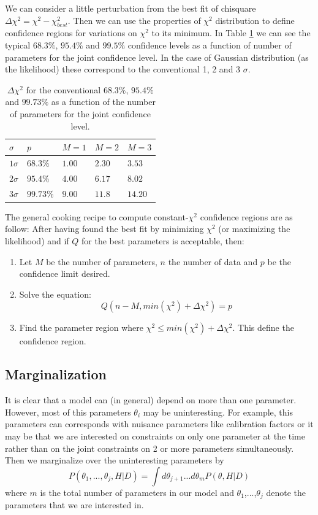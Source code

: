 \documentclass[onecolumn,           %
               showpacs,            %
               preprintnumbers,     %
               aps,                 %
               prl,          	    %
               letterpaper,             %
               superscriptaddress,      %
               nofootinbib,         %
               tightenlines,        %
               floats,floatfix      %
               ,usenatbib,
               ]{revtex4-1}
\begin{document}
We can consider a little perturbation from the best fit of chisquare $\Delta\chi^2=\chi^2-\chi^2_{best}$. Then we can use the properties of $\chi^2$ distribution to define confidence regions for variations on $\chi^2$ to its minimum. In Table \ref{tableerrors} we can see the typical $68.3 \%$, $95.4\%$ and $99.5\%$ confidence levels as a function of number of parameters for the joint confidence level. In the case of Gaussian distribution (as the likelihood) these correspond to the conventional 1, 2 and 3 $\sigma$.
\begin{table}[h!]
\centering
\begin{tabular}{||l|l|l|l|l||} 
 \hline
$\sigma$ & $p$ & $M=1$ & $M=2$ & $M=3$\\
\hline
$1\sigma$ & $68.3 \%$ & $1.00$ & $2.30$ & $3.53$\\
$2\sigma$ & $95.4 \%$ & $4.00$ & $6.17$ & $8.02$\\
$3\sigma$ & $99.73\%$ & $9.00$ & $11.8$ & $14.20$\\
\hline
\end{tabular}
\caption{\footnotesize{$\Delta \chi^2$ for the conventional $68.3\%$, $95.4\%$ and $99.73\%$ as a function of the number of parameters for the joint confidence level.}}\label{tableerrors}
\end{table}

The general cooking recipe to compute constant-$\chi^2$ confidence regions are as follow: After having found the best fit by minimizing $\chi^2$ (or maximizing the likelihood) and if $Q$ for the best parameters is acceptable, then:
\begin{enumerate}
\item Let $M$ be the number of parameters, $n$ the number of data and $p$ be the confidence limit desired.
\item Solve the equation:
\begin{equation}
Q(n-M,min(\chi^2)+\Delta\chi^2)=p
\end{equation}
\item Find the parameter region where $\chi^2\leq min(\chi^2)+\Delta\chi^2$. This define the confidence region.
\end{enumerate}
\subsection{Marginalization}

It is clear that a model can (in general) depend on more than one parameter. However, most of this parameters $\theta_i$ may be uninteresting. For example, this parameters can  corresponds with nuisance parameters like calibration factors or it may be that we are interested on constraints on only one parameter at the time rather than on the joint constraints on 2 or more parameters simultaneously. Then we marginalize over the uninteresting parameters by
\begin{equation}
P(\theta_1,...,\theta_j,H|D)=\int d\theta_{j+1}...d\theta_{m}P(\theta,H|D)
\end{equation}
where $m$ is the total number of parameters in our model and $\theta_1$,...,$\theta_j$ denote the parameters that we are interested in.
\end{document}
